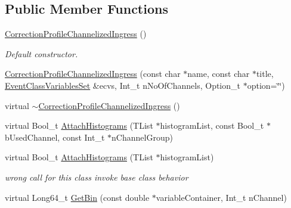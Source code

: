 \subsection*{Public Member Functions}
\begin{DoxyCompactItemize}
\item 
\mbox{\label{classQn_1_1CorrectionProfileChannelizedIngress_a659be643e7bf23a8a3d791092981b2a2}} 
\mbox{\hyperlink{classQn_1_1CorrectionProfileChannelizedIngress_a659be643e7bf23a8a3d791092981b2a2}{Correction\+Profile\+Channelized\+Ingress}} ()
\begin{DoxyCompactList}\small\item\em Default constructor. \end{DoxyCompactList}\item 
\mbox{\hyperlink{classQn_1_1CorrectionProfileChannelizedIngress_a9afde955744af4075b927913246ec065}{Correction\+Profile\+Channelized\+Ingress}} (const char $\ast$name, const char $\ast$title, \mbox{\hyperlink{classQn_1_1EventClassVariablesSet}{Event\+Class\+Variables\+Set}} \&ecvs, Int\+\_\+t n\+No\+Of\+Channels, Option\+\_\+t $\ast$option=\char`\"{}\char`\"{})
\item 
virtual \mbox{\hyperlink{classQn_1_1CorrectionProfileChannelizedIngress_a141b89a1b38a9b16023a9dc413a9be05}{$\sim$\+Correction\+Profile\+Channelized\+Ingress}} ()
\item 
virtual Bool\+\_\+t \mbox{\hyperlink{classQn_1_1CorrectionProfileChannelizedIngress_a770f44f4c5e700a71eb5a2cf5edab1a2}{Attach\+Histograms}} (T\+List $\ast$histogram\+List, const Bool\+\_\+t $\ast$b\+Used\+Channel, const Int\+\_\+t $\ast$n\+Channel\+Group)
\item 
\mbox{\label{classQn_1_1CorrectionProfileChannelizedIngress_a98ef1bc824701a5e2eb5deb20a6c524f}} 
virtual Bool\+\_\+t \mbox{\hyperlink{classQn_1_1CorrectionProfileChannelizedIngress_a98ef1bc824701a5e2eb5deb20a6c524f}{Attach\+Histograms}} (T\+List $\ast$histogram\+List)
\begin{DoxyCompactList}\small\item\em wrong call for this class invoke base class behavior \end{DoxyCompactList}\item 
virtual Long64\+\_\+t \mbox{\hyperlink{classQn_1_1CorrectionProfileChannelizedIngress_aa9e937955e58199dedc3a75e5d593aa2}{Get\+Bin}} (const double $\ast$variable\+Container, Int\+\_\+t n\+Channel)

\end{DoxyCompactItemize}
